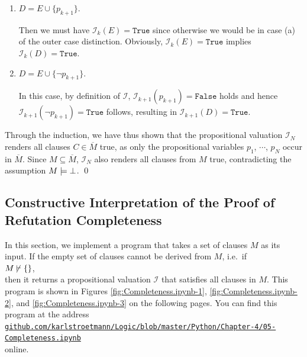 \begin{enumerate}
\begin{enumerate}
\begin{enumerate}[1.]
          In this case, $\mathcal{I}_{k+1}(D) = \mathtt{True}$ already holds by the induction hypothesis.        
    \item $D = E \cup \{ p_{k+1} \}$.

          Then we must have $\mathcal{I}_k(E) = \mathtt{True}$ since otherwise we would be in case (a) of the
          outer case distinction.  Obviously, $\mathcal{I}_k(E) = \mathtt{True}$ implies $\mathcal{I}_k(D) = \mathtt{True}$.
    \item $D = E \cup \{ \neg p_{k+1} \}$.

          In this case, by definition of $\mathcal{I}$, $\mathcal{I}_{k+1}(p_{k+1}) = \mathtt{False}$
          holds and hence $\mathcal{I}_{k+1}(\neg p_{k+1}) = \mathtt{True}$ follows, resulting in
          $\mathcal{I}_{k+1}(D) = \mathtt{True}$.
    \end{enumerate}
    
    Through the induction, we have thus shown that the propositional valuation
    $\mathcal{I}_{N}$ renders all clauses $C \in \overline{M}$ true, as only the
    propositional variables $p_1$, $\cdots$, $p_N$ occur in $\overline{M}$.
    Since $M \subseteq \overline{M}$, $\mathcal{I}_{N}$ also renders all clauses from $M$ true, 
    contradicting the assumption $M \models \bot$. \qed
  \end{enumerate}
\end{enumerate}

\subsection{Constructive Interpretation of the Proof of Refutation Completeness}
In this section, we implement a program that takes a set of clauses $M$ as its input.
If the empty set of clauses cannot be derived from $M$, i.e.~if
\\[0.2cm]
\hspace*{1.3cm}
$M\, {\not}\!\vdash \{\}$,
\\[0.2cm]
then it returns a propositional valuation $\mathcal{I}$ that satisfies all clauses in $M$.
This program is shown in Figures \ref{fig:Completeness.ipynb-1}, \ref{fig:Completeness.ipynb-2}, and \ref{fig:Completeness.ipynb-3} on the following pages. You can find this program at the address
\\[0.2cm]
\hspace*{0.3cm}
\href{https://github.com/karlstroetmann/Logic/blob/master/Python/Chapter-4/05-Completeness.ipynb}{\texttt{github.com/karlstroetmann/Logic/blob/master/Python/Chapter-4/05-Completeness.ipynb}}
\\[0.2cm]
online.

